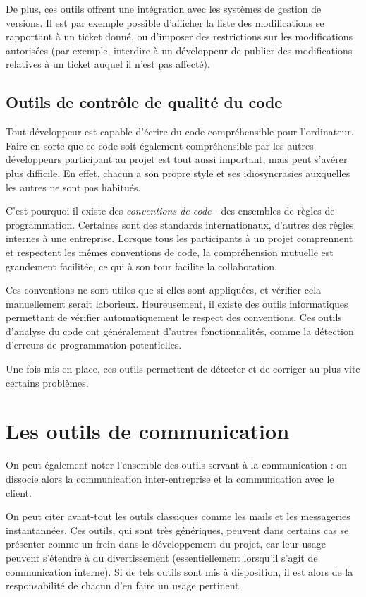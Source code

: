 De plus, ces outils offrent une intégration avec les systèmes de gestion de versions. Il est par exemple possible d’afficher la liste des modifications se rapportant à un ticket donné, ou d’imposer des restrictions sur les modifications autorisées (par exemple, interdire à un développeur de publier des modifications relatives à un ticket auquel il n’est pas affecté).

\subsection{Outils de contrôle de qualité du code}

Tout développeur est capable d’écrire du code compréhensible pour l’ordinateur. Faire en sorte que ce code soit également compréhensible par les autres développeurs participant au projet est tout aussi important, mais peut s’avérer plus difficile. En effet, chacun a son propre style et ses idiosyncrasies auxquelles les autres ne sont pas habitués.

C’est pourquoi il existe des \textit{conventions de code} - des ensembles de règles de programmation. Certaines sont des standards internationaux, d’autres des règles internes à une entreprise. Lorsque tous les participants à un projet comprennent et respectent les mêmes conventions de code, la compréhension mutuelle est grandement facilitée, ce qui à son tour facilite la collaboration.

Ces conventions ne sont utiles que si elles sont appliquées, et vérifier cela manuellement serait laborieux. Heureusement, il existe des outils informatiques permettant de vérifier automatiquement le respect des conventions. Ces outils d’analyse du code ont généralement d’autres fonctionnalités, comme la détection d’erreurs de programmation potentielles.

Une fois mis en place, ces outils permettent de détecter et de corriger au plus vite certains problèmes.

\section{Les outils de communication}

On peut également noter l'ensemble des outils servant à la communication : on dissocie alors la communication inter-entreprise et la communication avec le client.

On peut citer avant-tout les outils classiques comme les mails et les messageries instantannées. Ces outils, qui sont très génériques, peuvent dans certains cas se présenter comme un frein dans le développement du projet, car leur usage peuvent s'étendre à du divertissement (essentiellement lorsqu'il s'agit de communication interne). Si de tels outils sont mis à disposition, il est alors de la responsabilité de chacun d'en faire un usage pertinent.

